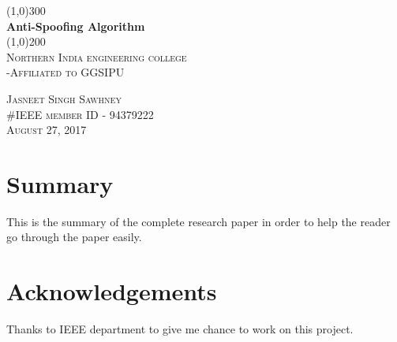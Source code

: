 \documentclass{article}
\begin{document}
\begin{comment}
this is used to comment out lines.
\title{Robust Anti-Spoofing Algorithm}
\author{Innovative Coder}
\date{August 27, 2017}
\maketitle
above written code will print t he report in very lame format 
the code written below is improved.
\end{comment}
\begin{titlepage}

	\begin{center}
	\line(1,0){300}\\
	[0.25 in]
	\huge{\bfseries Anti-Spoofing Algorithm}\\
	[2mm]
	\line(1,0){200}\\
	[1.5mm]
	\textsc{\LARGE Northern India engineering college}\\
	[0.75mm]
	\textsc{\Large -Affiliated to GGSIPU}\\
	[12.5cm]
	\end{center}
	
	\begin{flushright}  %
	\textsc{\large Jasneet Singh Sawhney\\
	\#IEEE member ID - 94379222\\
	August 27, 2017\\}
	\end{flushright}

\end{titlepage}

\section*{Summary} %
This is the summary of the complete research paper in order to help the reader go through the paper easily.
\cleardoublepage

\section*{Acknowledgements}
Thanks to IEEE department to give me chance to work on this project.
\cleardoublepage
\tableofcontents   %
\end{document}
